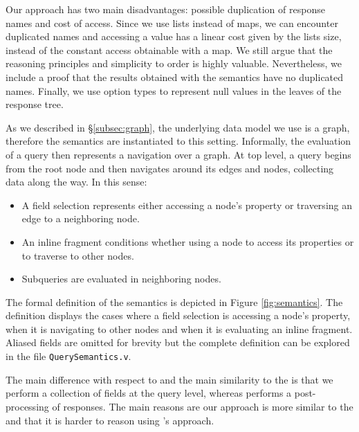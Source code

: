  Our approach has two main disadvantages: possible duplication of response names and cost of access. Since we use lists instead of maps, we can encounter duplicated names and accessing a value has a linear cost given by the lists size, instead of the constant access obtainable with a map. We still argue that the reasoning principles and simplicity to order is highly valuable. Nevertheless, we include a proof that the results obtained with the semantics have no duplicated names. Finally, we use option types to represent null values in the leaves of the response tree.



As we described in \S\ref{subsec:graph}, the underlying data model we use is a graph, therefore the semantics are instantiated to this setting. %
Informally, the evaluation of a query then represents a navigation over a graph. At top level, a query begins from the root node and then navigates around its edges and nodes, collecting data along the way. In this sense:
\begin{itemize}
    \item A field selection represents either accessing a node's property or traversing an edge to a neighboring node.
    \item An inline fragment conditions whether using a node to access its properties or to traverse to other nodes.
    \item Subqueries are evaluated in neighboring nodes.
\end{itemize}

The formal definition of the semantics is depicted in Figure \ref{fig:semantics}. The definition displays the cases where a field selection is accessing a node's property, when it is navigating to other nodes and when it is evaluating an inline fragment. Aliased fields are omitted for brevity but the complete definition can be explored in the file \texttt{QuerySemantics.v}.

The main difference with respect to \HP{} and the main similarity to the \spec{} is that we perform a collection of fields at the query level, whereas \HP{} performs a post-processing of responses. The main reasons are our approach is more similar to the \spec{} and that it is harder to reason using \HP{}'s approach.


